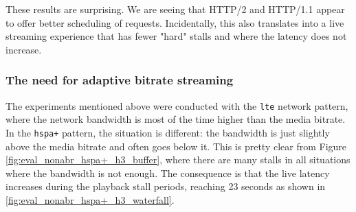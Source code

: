 These results are surprising. We are seeing that HTTP/2 and HTTP/1.1 appear to offer better scheduling of requests. Incidentally, this also translates into a live streaming experience that has fewer "hard" stalls and where the latency does not increase.

\subsubsection{The need for adaptive bitrate streaming}
\label{sec:eval/non-abr/adaptive}

The experiments mentioned above were conducted with the \texttt{lte} network pattern, where the network bandwidth is most of the time higher than the media bitrate. In the \texttt{hspa+} pattern, the situation is different: the bandwidth is just slightly above the media bitrate and often goes below it. This is pretty clear from Figure \ref{fig:eval_nonabr_hspa+_h3_buffer}, where there are many stalls in all situations where the bandwidth is not enough. The consequence is that the live latency increases during the playback stall periods, reaching 23 seconds as shown in \ref{fig:eval_nonabr_hspa+_h3_waterfall}.


